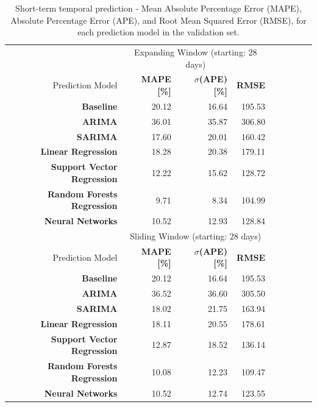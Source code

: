 \begin{table}
	\centering
	\begin{tabular}{@{}rrrrcrrrr@{}}
	\toprule\toprule
	& \multicolumn{3}{c}{Expanding Window (starting: 28 days)} & \phantom{abc} \\
	\cmidrule{2-4} \cmidrule{6-8}
	 {Prediction Model} & \textbf{MAPE [\%]} & \textbf{$\sigma$(APE) [\%]} & \textbf{RMSE}\\ 
	 \midrule[0.5pt]
	  \textbf{Baseline}                     & 20.12 & 16.64 & 195.53\\
	  \textbf{ARIMA}                        & 36.01 & 35.87 & 306.80\\
	  \textbf{SARIMA}                       & 17.60 & 20.01 & 160.42\\
	  \textbf{Linear Regression}            & 18.28 & 20.38 & 179.11\\
	  \textbf{Support Vector Regression}    & 12.22 & 15.62 & 128.72\\  
	  \textbf{Random Forests Regression}    & 9.71  & 8.34  & 104.99\\
	  \textbf{Neural Networks}              & 10.52 & 12.93 & 128.84\\
	  
	  \toprule
	  
	  	& \multicolumn{3}{c}{Sliding Window (starting: 28 days)} & \phantom{abc} \\
	  \cmidrule{2-4} \cmidrule{6-8}
	  {Prediction Model} & \textbf{MAPE [\%]} & \textbf{$\sigma$(APE) [\%]} & \textbf{RMSE}\\ 
	  \midrule
	  \textbf{Baseline}                     & 20.12 & 16.64 & 195.53 \\
	  \textbf{ARIMA}                        & 36.52 & 36.60 & 305.50 \\
	  \textbf{SARIMA}                       & 18.02 & 21.75 & 163.94 \\
	  \textbf{Linear Regression}            & 18.11 & 20.55 & 178.61 \\
	  \textbf{Support Vector Regression}    & 12.87 & 18.52 & 136.14 \\  
	  \textbf{Random Forests Regression}    & 10.08 & 12.23 & 109.47 \\
	  \textbf{Neural Networks}              & 10.52 & 12.74 & 123.55 \\
	  
	\bottomrule\bottomrule
	\end{tabular}
	\caption{Short-term temporal prediction - Mean Absolute Percentage Error (MAPE), Absolute Percentage Error (APE), and Root Mean Squared Error (RMSE), for each prediction model in the validation set.}
\label{tab:8_4_results-dynamic-models}
\end{table}

